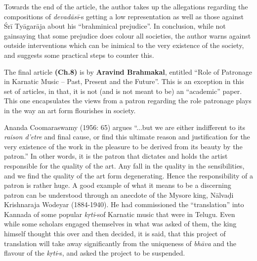 Towards the end of the article, the author takes up the allegations regarding the compositions of \textit{devadāsī}-s getting a low representation as well as those against Śrī Tyāgarāja about his “brahminical prejudice”. In conclusion, while not gainsaying that some prejudice does colour all societies, the author warns against outside interventions which can be inimical to the very existence of the society, and suggests some practical steps to counter this.

The final article \textbf{(Ch.8)} is by \textbf{Aravind Brahmakal}, entitled “Role of Patronage in Karnatic Music – Past, Present and the Future”. This is an exception in this set of articles, in that, it is not (and is not meant to be) an “academic” paper. This one encapsulates the views from a patron regarding the role patronage plays in the way an art form flourishes in society.

\newpage

Ananda Coomaraswamy (1956: 65) argues “...but we are either indifferent to its \textit{raison d'etre} and final cause, or find this ultimate reason and justification for the very existence of the work in the pleasure to be derived from its beauty by the patron.” In other words, it is the patron that dictates and holds the artist responsible for the quality of the art. Any fall in the quality in the sensibilities, and we find the quality of the art form degenerating. Hence the responsibility of a patron is rather huge. A good example of what it means to be a discerning patron can be understood through an anecdote of the Mysore king, Nālvaḍi Krishnaraja Wodeyar (1884-1940). He had commissioned the “translation” into Kannada of some popular \textit{kṛti}-s\break of Karnatic music that were in Telugu. Even while some scholars engaged themselves in what was asked of them, the king himself thought this over and then decided, it is said, that this project of translation will take away significantly from the uniqueness of \textit{bhāva} and the flavour of the \textit{kṛti}-s, and asked the project to be suspended.

